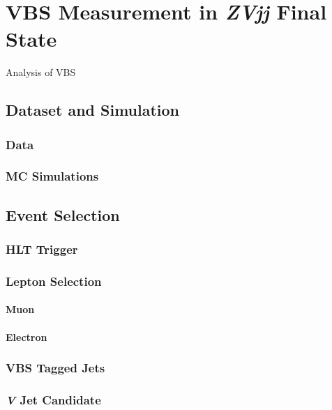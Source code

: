 \chapter{
  VBS Measurement in \textit{ZVjj} Final State
 }\label{ch_vbs}

Analysis of \gls{VBS}

\section{
  Dataset and Simulation
 }

\subsection{
  Data
}

\subsection{
  MC Simulations
}

\section{
  Event Selection
 }

\subsection{
  HLT Trigger
}

\subsection{
  Lepton Selection
}

\subsubsection{
  Muon
}

\subsubsection{
  Electron
}

\subsection{
  VBS Tagged Jets
}

\subsection{
  \textit{V} Jet Candidate
}
